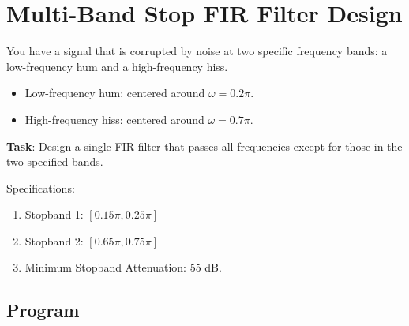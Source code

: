 \pagebreak
\section{Multi-Band Stop FIR Filter Design}
You have a signal that is corrupted by noise at two specific frequency bands: a low-frequency hum and a high-frequency hiss.
\begin{itemize}
	\item Low-frequency hum: centered around $\omega=0.2\pi$.
	\item High-frequency hiss: centered around $\omega=0.7\pi$.
\end{itemize}
\textbf{Task}: Design a single FIR filter that passes all frequencies except for those in the two specified bands.

Specifications:
\begin{enumerate}
	\item Stopband 1: $[0.15\pi, 0.25\pi]$
	\item Stopband 2: $[0.65\pi, 0.75\pi]$
	\item Minimum Stopband Attenuation: 55 dB.
\end{enumerate}

\subsection*{Program}


\begin{figure*}[ht!]
\end{figure*}